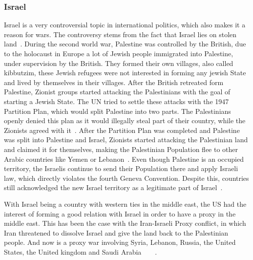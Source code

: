 \subsubsection{Israel} %
Israel is a very controversial topic in international politics, which also makes it a reason for wars. The controversy stems from the fact that Israel lies on stolen land~\autocite{aljazeera-israel-illegal-settlement}.
During the second world war, Palestine was controlled by the British, due to the holocaust in Europe a lot of Jewish people immigrated into Palestine, under supervision by the British. They formed their own villages, also called kibbutzim, these Jewish refugees were not interested in forming any jewish State and lived by themselves in their villages. After the British retreated form Palestine, Zionist groups started attacking the Palestinians with the goal of starting a Jewish State. The UN tried to settle these attacks with the 1947 Partition Plan, which would split Palestine into two parts. The Palestinians openly denied this plan as it would illegally steal part of their country, while the Zionists agreed with it~\autocite{aljazeera-israel-illegal-settlement}.
After the Partition Plan was completed and Palestine was split into Palestine and Israel, Zionists started attacking the Palestinian land and claimed it for themselves, making the Palestinian Population flee to other Arabic countries like Yemen or Lebanon~\autocite{aljazeera-israel-illegal-settlement}. 
Even though Palestine is an occupied territory, the Israelis continue to send their Population there and apply Israeli law, which directly violates the fourth Geneva Convention. Despite this, countries still acknowledged the new Israel territory as a legitimate part of Israel~\autocite{aljazeera-israel-illegal-settlement}.

With Israel being a country with western ties in the middle east, the US had the interest of forming a good relation with Israel in order to have a proxy in the middle east. This has been the case with the Iran-Israeli Proxy conflict, in which Iran threatened to dissolve Israel and give the land back to the Palestinian people. And now is a proxy war involving Syria, Lebanon, Russia, the United States, the United kingdom and Saudi Arabia~\autocite{aljazeera-israel-iran-shadow}~\autocite{smh-shadow-war-israel-iran}~\autocite{lemonde-shadow-war-israel-iran}~\autocite{time-shadow-war-israel-iran}.